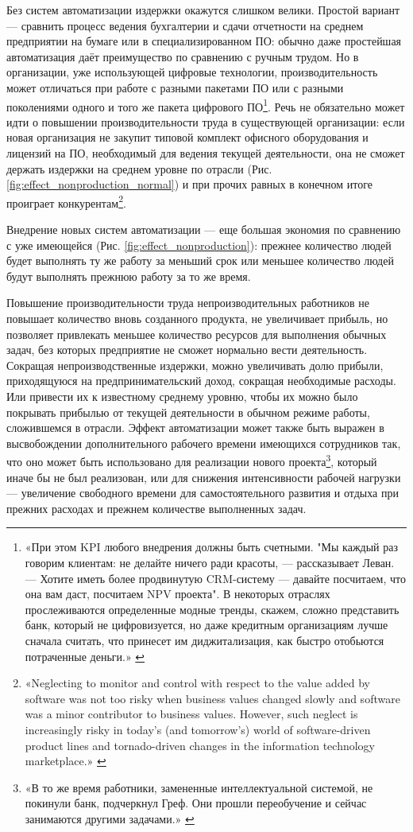 \documentclass{article}
\begin{document}
Без систем автоматизации издержки окажутся слишком велики. Простой вариант — сравнить процесс ведения бухгалтерии и сдачи отчетности на среднем предприятии на бумаге или в специализированном ПО: обычно даже простейшая автоматизация даёт преимущество по сравнению с ручным трудом. Но в организации, уже использующей цифровые технологии, производительность может отличаться при работе с разными пакетами ПО или с разными поколениями одного и того же пакета цифрового ПО\footnote{«При этом KPI любого внедрения должны быть счетными. "Мы каждый раз говорим клиентам: не делайте ничего ради красоты, — рассказывает Леван. — Хотите иметь более продвинутую CRM-систему — давайте посчитаем, что она вам даст, посчитаем NPV проекта". В некоторых отраслях прослеживаются определенные модные тренды, скажем, сложно представить банк, который не цифровизуется, но даже кредитным организациям лучше сначала считать, что принесет им диджитализация, как быстро отобьются потраченные деньги.» \cite{vedomostiItIsReal}}. Речь не обязательно может идти о повышении производительности труда в существующей организации: если новая организация не закупит типовой комплект офисного оборудования и лицензий на ПО, необходимый для ведения текущей деятельности, она не сможет держать издержки на среднем уровне по отрасли (Рис. \ref{fig:effect_nonproduction_normal}) и при прочих равных в конечном итоге проиграет конкурентам\footnote{«Neglecting to monitor and control with respect to the value added by software was not too risky when business values changed slowly and software was a minor contributor to business values. However, such neglect is increasingly risky in today’s (and tomorrow’s) world of software-driven product lines and tornado-driven changes in the information technology marketplace.» \cite{valueBasedSoftware2003}}.

Внедрение новых систем автоматизации — еще большая  экономия по сравнению с уже имеющейся (Рис. \ref{fig:effect_nonproduction}): прежнее количество людей будет выполнять ту же работу за меньший срок или меньшее количество людей будут выполнять прежнюю работу за то же время.

Повышение производительности труда непроизводительных работников не повышает количество вновь созданного продукта, не увеличивает прибыль, но позволяет привлекать меньшее количество ресурсов для выполнения обычных задач, без которых предприятие не сможет нормально вести деятельность. Сокращая непроизводственные издержки, можно увеличивать долю прибыли, приходящуюся на предпринимательский доход, сокращая необходимые расходы. Или привести их к известному среднему уровню, чтобы их можно было покрывать прибылью от текущей деятельности в обычном режиме работы, сложившемся в отрасли. Эффект автоматизации может также быть выражен в высвобождении дополнительного рабочего времени имеющихся сотрудников так, что оно может быть использовано для реализации нового проекта\footnote{«В то же время работники, замененные интеллектуальной системой, не покинули банк, подчеркнул Греф. Они прошли переобучение и сейчас занимаются другими задачами.» \cite{sberAiJobcut2018}}, который иначе бы не был реализован, или для снижения интенсивности рабочей нагрузки — увеличение свободного времени для самостоятельного развития и отдыха при прежних расходах и прежнем количестве выполненных задач.
\end{document}
